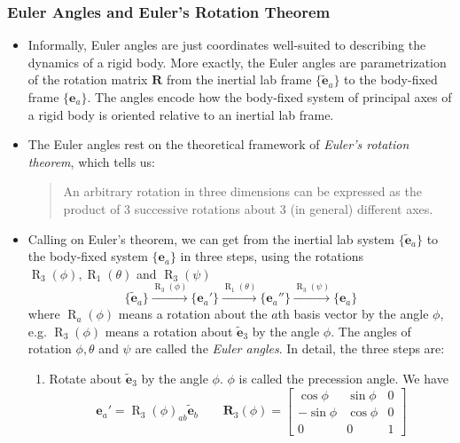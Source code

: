 \documentclass[11pt, a4paper]{article}
\newcommand{\e}{\bm{e}} %
\newcommand{\mat}[1]{\mathbf{#1}}
\begin{document}
\subsubsection{Euler Angles and Euler's Rotation Theorem}

\begin{itemize}

	\item Informally, Euler angles are just coordinates well-suited to describing the dynamics of a rigid body. More exactly, the Euler angles are parametrization of the rotation matrix $ \mat{R} $ from the inertial lab frame $ \{\tilde{\e}_{a} \} $ to the body-fixed frame $ \{\e_{a}\} $. The angles encode how the body-fixed system of principal axes of a rigid body is oriented relative to an inertial lab frame. 
	
	\item The Euler angles rest on the theoretical framework of  \textit{Euler's rotation theorem}, which tells us:
	\begin{quote}
		An arbitrary rotation in three dimensions can be expressed as the product of 3 successive rotations about 3 (in general) different axes.
	\end{quote}

	
	\item Calling on Euler's theorem, we can get from the inertial lab system $ \{ \tilde{\e}_{a} \} $ to the body-fixed system $ \{\e_{a}\} $ in three steps, using the rotations $ \operatorname{R}_{3}(\phi), \operatorname{R}_{1}(\theta) $ and $ \operatorname{R}_{3}(\psi) $
	\begin{equation*}
		\{\tilde{\e}_{a} \} \stackrel{\operatorname{R}_{3}(\phi)}{\to} \{\e_{a}' \} \stackrel{\operatorname{R}_{1}(\theta)}{\to} 
		\{\e_{a}'' \} \stackrel{\operatorname{R}_{3}(\psi)}{\to} \{\e_{a} \}
	\end{equation*}
	where $ \operatorname{R}_{a}(\phi) $ means a rotation about the $ a $th basis vector by the angle $ \phi $, e.g. $ \operatorname{R}_{3}(\phi) $ means a rotation about $ \tilde{\e}_{3} $ by the angle $ \phi $. The angles of rotation $ \phi, \theta $ and $ \psi $ are called the \textit{Euler angles}. In detail, the three steps are:
	\begin{enumerate}
		\item Rotate about $ \tilde{\e}_{3} $ by the angle $ \phi $. $ \phi $ is called the precession angle. We have
		\[
			\e_{a}' = \operatorname{R}_{3}(\phi)_{ab} \tilde{\e}_{b} \qquad \mathbf{R}_{3} (\phi) = 
			\begin{bmatrix}
				\cos \phi & \sin \phi & 0\\
				- \sin \phi & \cos \phi & 0\\
				0 & 0 & 1
			\end{bmatrix}
		\]
		

\end{enumerate}
\end{itemize}
\end{document}
